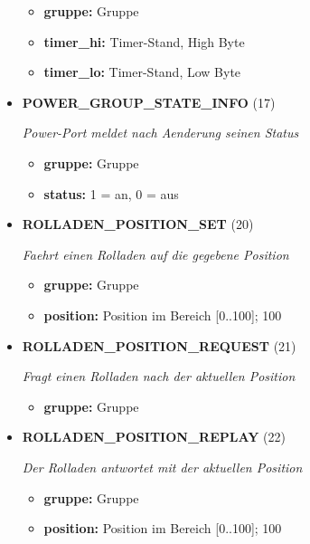 \begin{itemize}
\begin{itemize}
\item \textbf{gruppe:} Gruppe
\item \textbf{timer\_hi:} Timer-Stand, High Byte
\item \textbf{timer\_lo:} Timer-Stand, Low Byte
\end{itemize}
\normalsize
	
\item \textbf{POWER\_GROUP\_STATE\_INFO} (17)

\textit{Power-Port meldet nach Aenderung seinen Status}

\small
\begin{itemize}
		
\item \textbf{gruppe:} Gruppe
\item \textbf{status:} 1 = an, 0 = aus
\end{itemize}
\normalsize
	
\item \textbf{ROLLADEN\_POSITION\_SET} (20)

\textit{Faehrt einen Rolladen auf die gegebene Position}

\small
\begin{itemize}
		
\item \textbf{gruppe:} Gruppe
\item \textbf{position:} Position im Bereich [0..100]; 100%
\end{itemize}
\normalsize
	
\item \textbf{ROLLADEN\_POSITION\_REQUEST} (21)

\textit{Fragt einen Rolladen nach der aktuellen Position}

\small
\begin{itemize}
		
\item \textbf{gruppe:} Gruppe
\end{itemize}
\normalsize
	
\item \textbf{ROLLADEN\_POSITION\_REPLAY} (22)

\textit{Der Rolladen antwortet mit der aktuellen Position}

\small
\begin{itemize}
		
\item \textbf{gruppe:} Gruppe
\item \textbf{position:} Position im Bereich [0..100]; 100%
\end{itemize}
\normalsize
	

\end{itemize}
